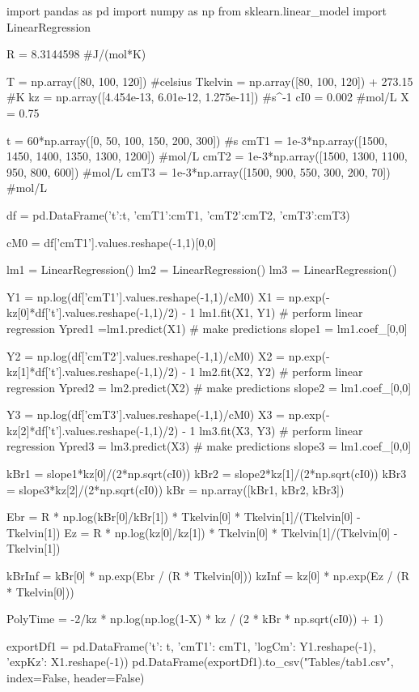 \begin{pycode}
import pandas as pd
import numpy as np
from sklearn.linear_model import LinearRegression

R = 8.3144598 #J/(mol*K)

T = np.array([80, 100, 120]) #celsius
Tkelvin = np.array([80, 100, 120]) + 273.15 #K
kz = np.array([4.454e-13, 6.01e-12, 1.275e-11]) #s^-1
cI0 = 0.002 #mol/L
X = 0.75

t = 60*np.array([0, 50, 100, 150, 200, 300]) #s
cmT1 = 1e-3*np.array([1500, 1450, 1400, 1350, 1300, 1200]) #mol/L
cmT2 = 1e-3*np.array([1500, 1300, 1100, 950, 800, 600]) #mol/L
cmT3 = 1e-3*np.array([1500, 900, 550, 300, 200, 70]) #mol/L

df = pd.DataFrame({'t':t, 'cmT1':cmT1, 'cmT2':cmT2, 'cmT3':cmT3})

cM0 = df['cmT1'].values.reshape(-1,1)[0,0]

lm1 = LinearRegression()
lm2 = LinearRegression()
lm3 = LinearRegression()

Y1 = np.log(df['cmT1'].values.reshape(-1,1)/cM0)
X1 = np.exp(-kz[0]*df['t'].values.reshape(-1,1)/2) - 1 
lm1.fit(X1, Y1)         # perform linear regression
Ypred1 =lm1.predict(X1) # make predictions
slope1 = lm1.coef_[0,0]

Y2 = np.log(df['cmT2'].values.reshape(-1,1)/cM0)
X2 = np.exp(-kz[1]*df['t'].values.reshape(-1,1)/2) - 1 
lm2.fit(X2, Y2)         # perform linear regression
Ypred2 = lm2.predict(X2) # make predictions
slope2 = lm1.coef_[0,0]

Y3 = np.log(df['cmT3'].values.reshape(-1,1)/cM0)
X3 = np.exp(-kz[2]*df['t'].values.reshape(-1,1)/2) - 1 
lm3.fit(X3, Y3)         # perform linear regression
Ypred3 = lm3.predict(X3) # make predictions
slope3 = lm1.coef_[0,0]

kBr1 = slope1*kz[0]/(2*np.sqrt(cI0))
kBr2 = slope2*kz[1]/(2*np.sqrt(cI0))
kBr3 = slope3*kz[2]/(2*np.sqrt(cI0))
kBr = np.array([kBr1, kBr2, kBr3])

Ebr = R * np.log(kBr[0]/kBr[1]) * Tkelvin[0] * Tkelvin[1]/(Tkelvin[0] - Tkelvin[1])
Ez = R * np.log(kz[0]/kz[1]) * Tkelvin[0] * Tkelvin[1]/(Tkelvin[0] - Tkelvin[1])

kBrInf = kBr[0] * np.exp(Ebr / (R * Tkelvin[0]))
kzInf = kz[0] * np.exp(Ez / (R * Tkelvin[0]))

PolyTime = -2/kz * np.log(np.log(1-X) * kz / (2 * kBr * np.sqrt(cI0)) + 1)

exportDf1 = pd.DataFrame({'t': t, 'cmT1': cmT1, 'logCm': Y1.reshape(-1), 'expKz': X1.reshape(-1)})
pd.DataFrame(exportDf1).to_csv("Tables/tab1.csv", index=False, header=False)


\end{pycode}
